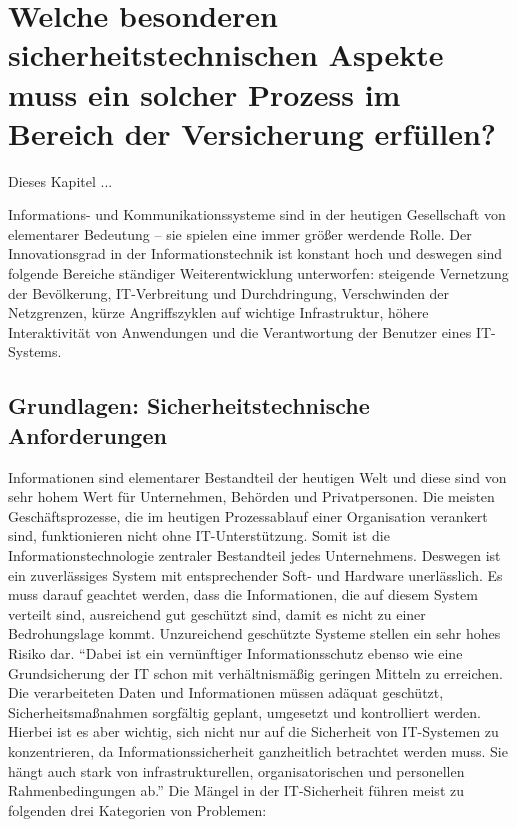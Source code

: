 \chapter[Forschungsfrage 3]{Welche besonderen sicherheitstechnischen Aspekte muss ein solcher Prozess im Bereich der Versicherung erfüllen?} \label{ff3}
Dieses Kapitel ... 
\par
Informations- und Kommunikationssysteme sind in der heutigen Gesellschaft von elementarer Bedeutung -- sie spielen eine immer größer werdende Rolle. Der Innovationsgrad in der Informationstechnik ist konstant hoch und deswegen sind folgende Bereiche ständiger Weiterentwicklung unterworfen: steigende Vernetzung der Bevölkerung, IT-Verbreitung und Durchdringung, Verschwinden der Netzgrenzen, kürze Angriffszyklen auf wichtige Infrastruktur, höhere Interaktivität von Anwendungen und die Verantwortung der Benutzer eines IT-Systems.\autocite[vgl.][S.\,2f.]{bundesamt_fur_sicherheit_in_der_informationstechnik_bsi_it-grundschutz-kompendium_2020}

\section{Grundlagen: Sicherheitstechnische Anforderungen}\label{kap:sicherheitstechnischeAnforderungen}
Informationen sind elementarer Bestandteil der heutigen Welt und diese sind von sehr hohem Wert für Unternehmen, Behörden und Privatpersonen. Die meisten Geschäftsprozesse, die im heutigen Prozessablauf einer Organisation verankert sind, funktionieren nicht ohne IT-Unterstützung. Somit ist die Informationstechnologie zentraler Bestandteil jedes Unternehmens. Deswegen ist ein zuverlässiges System mit entsprechender Soft- und Hardware unerlässlich. Es muss darauf geachtet werden, dass die Informationen, die auf diesem System verteilt sind, ausreichend gut geschützt sind, damit es nicht zu einer Bedrohungslage kommt. Unzureichend geschützte Systeme stellen ein sehr hohes Risiko dar. \enquote{Dabei ist ein vernünftiger Informationsschutz ebenso wie eine Grundsicherung der IT schon mit verhältnismäßig geringen Mitteln zu erreichen. Die verarbeiteten Daten und Informationen müssen adäquat geschützt, Sicherheitsmaßnahmen sorgfältig geplant, umgesetzt und kontrolliert werden. Hierbei ist es aber wichtig, sich nicht nur auf die Sicherheit von IT-Systemen zu konzentrieren, da Informationssicherheit ganzheitlich betrachtet werden muss. Sie	hängt auch stark von infrastrukturellen, organisatorischen und personellen Rahmenbedingungen ab.}\autocite[][S.\,1]{bundesamt_fur_sicherheit_in_der_informationstechnik_bsi_it-grundschutz-kompendium_2020} Die Mängel in der IT-Sicherheit führen meist zu folgenden drei Kategorien von Problemen\autocite[vgl.][S.\,1ff.]{bundesamt_fur_sicherheit_in_der_informationstechnik_bsi_it-grundschutz-kompendium_2020}: 

